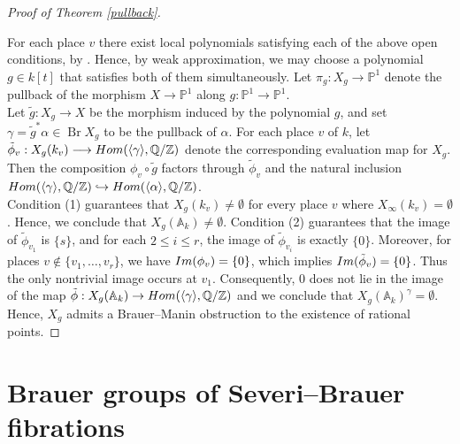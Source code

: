 \documentclass[11pt]{amsart}
\theoremstyle{plain}
\theoremstyle{definition}
\newcommand{\Hom}{{\rm Hom}}
\newcommand{\im}{{\rm Im}}
\newcommand{\Q}{{\mathbb Q}}
\newcommand{\Z}{{\mathbb Z}}
\DeclareMathOperator{\Br}{Br}
\begin{document}
\begin{proof}[{Proof of Theorem \ref{pullback}}]
\begin{enumerate}[label=\arabic*.]
\end{enumerate}
For each place \(v\) there exist local polynomials satisfying each of the above open conditions, by \cite[Lemma~4.3]{berg}. Hence, by weak approximation, we may choose a polynomial \( g \in k[t] \) that satisfies both of them simultaneously. Let \(\pi_g: X_g \longrightarrow \mathbb{P}^1\) denote the pullback of the morphism \( X \to \mathbb{P}^1 \) along \( g: \mathbb{P}^1 \to \mathbb{P}^1 \).\\
Let \( \tilde{g}: X_g \to X \) be the morphism induced by the polynomial \( g \), and set \(\gamma = \tilde{g}^*\alpha \in \Br X_g\) to be the pullback of \(\alpha\). For each place \( v \) of \( k \), let  
\(
\tilde{\phi}_v: X_g(k_v) \longrightarrow \Hom(\langle \gamma \rangle, \Q/\Z)
\)
denote the corresponding evaluation map for \( X_g \). Then the composition \(\phi_v \circ \tilde{g}\) factors through \(\tilde{\phi}_v\) and the natural inclusion  
\(\Hom(\langle \gamma \rangle, \Q/\Z) \hookrightarrow \Hom(\langle \alpha \rangle, \Q/\Z)\).\\
Condition (1) guarantees that $X_g(k_v) \neq \emptyset$ for every place $v$ where $X_\infty(k_v) = \emptyset$. Hence, we conclude that $X_g(\mathbb{A}_k) \neq \emptyset$. Condition (2) guarantees that the image of \( \tilde{\phi}_{v_1} \) is \(\{s\}\), and for each \( 2 \leq i \leq r \), the image of \( \tilde{\phi}_{v_i} \) is exactly \(\{0\}\). Moreover, for places \( v \notin \{v_1, \dots, v_r\} \), we have \(\im(\phi_{v}) = \{0\}\), which implies \(\im(\tilde{\phi}_{v}) = \{0\}\). Thus the only nontrivial image occurs at \( v_1 \). Consequently, \(0\) does not lie in the image of the map \( \tilde{\phi}: X_g(\mathbb{A}_k) \rightarrow \Hom(\langle \gamma \rangle, \Q/\Z)\) and we conclude that  
\(X_g(\mathbb{A}_k)^{\gamma} = \emptyset\). Hence, \( X_g \) admits a Brauer--Manin obstruction to the existence of rational points.

\end{proof}
\section{Brauer groups of Severi--Brauer fibrations}\label{Brauer Group of Severi--Brauer fibration}
\end{document}
